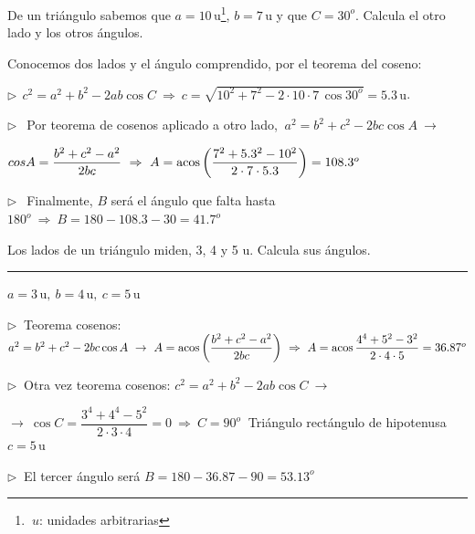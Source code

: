 \begin{miejemplo}
	
	De un triángulo sabemos que $a=10\, \mathrm{u}$\footnote{$\ u$: unidades arbitrarias}, $b=7 \, \mathrm{u}$ y que $C=30^o$. Calcula el otro lado y los otros ángulos.

\vspace{5mm} Conocemos dos lados y el ángulo comprendido, por el teorema del coseno:

\vspace{2mm} $\triangleright \ \ c^2=a^2+b^2-2ab\cos C \ \Rightarrow \ c=\sqrt{10^2+7^2-2\cdot 10 \cdot 7\, \cos 30^o}=5.3 \, \mathrm{u}$.

\vspace{2mm} $\triangleright \ \ $ Por teorema de cosenos aplicado a otro lado, $\ a^2=b^2+c^2-2bc\cos A \ \to \ $

$cos A =  \dfrac{b^2+c^2-a^2}{2bc}  \ \Rightarrow \ A=\acos \left( \dfrac{7^2+5.3^2-10^2}{2\cdot 7 \cdot 5.3} \right)= 108.3^o$

\vspace{2mm} $\triangleright \ \ $ Finalmente, $B$ será el ángulo que falta hasta $180^o \ \Rightarrow \ B=180-108.3-30=41.7^o$
\end{miejemplo}

\begin{miejercicio}

Los lados de un triángulo miden, 3, 4 y 5 u. Calcula sus ángulos.

\rule{250pt}{0.1pt}	

\vspace{4mm} $a=3\, \mathrm{u},\ b=4 \, \mathrm{u}, \ c=5 \, \mathrm{u}$

\vspace{2mm} $\triangleright \ $ Teorema cosenos: $a^2=b^2+c^2-2bc\cos A \ \to \ A=\acos \left( \dfrac{b^2+c^2-a^2}{2bc} \right) \ \Rightarrow \ A=\acos \dfrac{4^4+5^2-3^2}{2\cdot 4\cdot 5} = 36.87^o$

\vspace{2mm} $\triangleright \ $ Otra vez teorema cosenos: $c^2=a^2+b^2-2ab\cos C \ \to $

$\to \ \cos C= \dfrac{3^4+4^4-5^2}{2\cdot 3\cdot 4}= 0 \ \Rightarrow \ C = 90^o\ $ Triángulo rectángulo de hipotenusa $c=5 \, \mathrm{u}$

\vspace{2mm} $\triangleright \ $ El tercer ángulo será $B=180-36.87-90=53.13^o$
\end{miejercicio}



